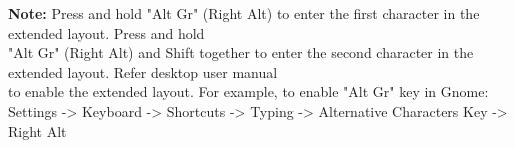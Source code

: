 \documentclass[11pt,a4paper]{article}
\begin{document}
\vspace*{1cm}

{\bfseries Note:} Press and hold "Alt Gr" (Right Alt) to enter the first character in the extended
layout.  Press and hold\\
\indent "Alt Gr" (Right Alt) and Shift together to enter the second character in the extended
layout.  Refer desktop user manual\\
\indent to enable the extended layout.  For example, to enable "Alt Gr" key in Gnome:\\
\indent Settings -> Keyboard -> Shortcuts -> Typing -> Alternative Characters Key -> Right Alt\\[2cm]
\end{document}
